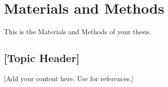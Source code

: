 \chapter{Materials and Methods}
\label{chap:materialsandmethods}

This is the Materials and Methods of your thesis.

\section{[Topic Header]}
[Add your content here. Use \cite{sample} for references.]
